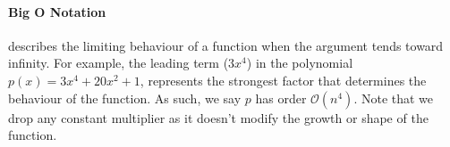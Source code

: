 \paragraph{Big O Notation} describes the limiting behaviour of a function when the argument tends toward infinity.
\label{supp::big_o}
For example, the leading term ($3 x^4$) in the polynomial $p(x) = 3 x^4 + 20 x^2 + 1$, represents the strongest factor that determines the behaviour of the function. As such, we say $p$ has order $\mathcal{O}(n^4)$. Note that we drop any constant multiplier as it doesn't modify the growth or shape of the function.